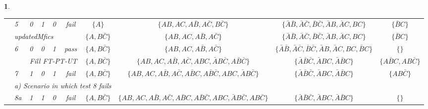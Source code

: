 \documentclass[
12pt, %
oneside, %
english, %
singlespacing, %
headsepline, %
consistentlayout, %
]{MastersDoctoralThesis} %
\newtheorem{example}[thm]{\protect\examplename}
\providecommand{\examplename}{Example}
\theoremstyle{plain}
\theoremstyle{definition}
\theoremstyle{remark}
\theoremstyle{plain}
\theoremstyle{plain}
\providecommand{\examplename}{Example}
\theoremstyle{remark}
\begin{document}
\begin{example}
\begin{table}[!tb]
{\begin{tabular}{c|lc|c|c||c|c|c|c|c}
				& 5 & 0 & 1 & 0 & fail & $\{A\}$ & $\{AB, AC, A\bar{B}, A\bar{C},B\bar{C}\}$ & $\{\bar{A}\bar{B}, \bar{A}\bar{C}, \bar{B}\bar{C}, \bar{A}B, \bar{A}C, BC\}$ & $\{\bar{B}C\}$\\
				& \multicolumn{5}{l}{updatedMfics} & $\{A, B\bar{C}\}$ & $\{AB, AC, A\bar{B}, A\bar{C}\}$ & $\{\bar{A}\bar{B}, \bar{A}\bar{C}, \bar{B}\bar{C}, \bar{A}B, \bar{A}C, BC\}$ & $\{\bar{B}C\}$\\
				
				& 6& 0 & 0 & 1 & pass & $\{A, B\bar{C}\}$ &$\{AB, AC, A\bar{B}, A\bar{C}\}$ & $\{\bar{A}\bar{B}, \bar{A}\bar{C}, \bar{B}\bar{C}, \bar{A}B, \bar{A}C, BC, \bar{B}C\}$ & $\{\}$\\
				
				\midrule
				\multirow{7}{*}{\rotatebox{90}{$t=3$}} %
				& & \multicolumn{4}{c}{Fill FT-PT-UT} & $\{A, B\bar{C}\}$ &$\{AB, AC, A\bar{B}, A\bar{C}, ABC, \bar{A}B\bar{C}, A\bar{B}\bar{C}\}$ & $\{\bar{A}\bar{B}\bar{C}, \bar{A}BC, \bar{A}\bar{B}C\}$ & $\{A\bar{B}C, AB\bar{C}\}$\\
				
				\cline{2-10}
				& 7 & 1 & 0 & 1 & fail & $\{A, B\bar{C}\}$ & $\{AB, AC, A\bar{B}, A\bar{C}, A\bar{B}C, A\bar{B}\bar{C}, ABC, \bar{A}B\bar{C}\}$ & $\{\bar{A}\bar{B}\bar{C}, \bar{A}BC, \bar{A}\bar{B}C\}$ & $\{AB\bar{C}\}$\\
				
				\cline{2-10}
				& \multicolumn{6}{c}{a) Scenario in which test 8 fails} \\
				& 8a & 1 & 1 & 0 & fail & $\{A, B\bar{C}\}$ & $\{AB, AC, A\bar{B}, A\bar{C}, A\bar{B}C, A\bar{B}\bar{C}, ABC, \bar{A}B\bar{C}, AB\bar{C}\}$ & $\{\bar{A}\bar{B}\bar{C}, \bar{A}BC, \bar{A}\bar{B}C\}$ & $\{\}$\\
				

\end{tabular}}
\end{table}
\end{example}
\end{document}
